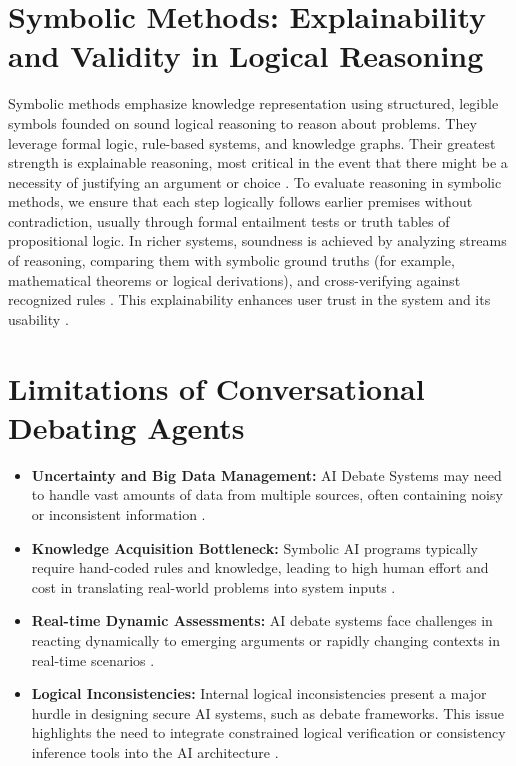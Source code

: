 \documentclass[conference]{IEEEtran}
\begin{document}
\section{Symbolic Methods: Explainability and Validity in Logical Reasoning}
Symbolic methods emphasize knowledge representation using structured, legible symbols founded on sound logical reasoning to reason about problems. They leverage formal logic, rule-based systems, and knowledge graphs. Their greatest strength is explainable reasoning, most critical in the event that there might be a necessity of justifying an argument or choice \cite{b11}. To evaluate reasoning in symbolic methods, we ensure that each step logically follows earlier premises without contradiction, usually through formal entailment tests or truth tables of propositional logic. In richer systems, soundness is achieved by analyzing streams of reasoning, comparing them with symbolic ground truths (for example, mathematical theorems or logical derivations), and cross-verifying against recognized rules \cite{b20}. This explainability enhances user trust in the system and its usability \cite{b11}.

\section{Limitations of Conversational Debating Agents}
\begin{itemize}
    \item \textbf{Uncertainty and Big Data Management:} AI Debate Systems may need to handle vast amounts of data from multiple sources, often containing noisy or inconsistent information \cite{b11}.
    
    \item \textbf{Knowledge Acquisition Bottleneck:} Symbolic AI programs typically require hand-coded rules and knowledge, leading to high human effort and cost in translating real-world problems into system inputs \cite{b11}.
    
    \item \textbf{Real-time Dynamic Assessments:} AI debate systems face challenges in reacting dynamically to emerging arguments or rapidly changing contexts in real-time scenarios \cite{b11}.
    
    \item \textbf{Logical Inconsistencies:} Internal logical inconsistencies present a major hurdle in designing secure AI systems, such as debate frameworks. This issue highlights the need to integrate constrained logical verification or consistency inference tools into the AI architecture \cite{b10}.
\end{itemize}
\end{document}
